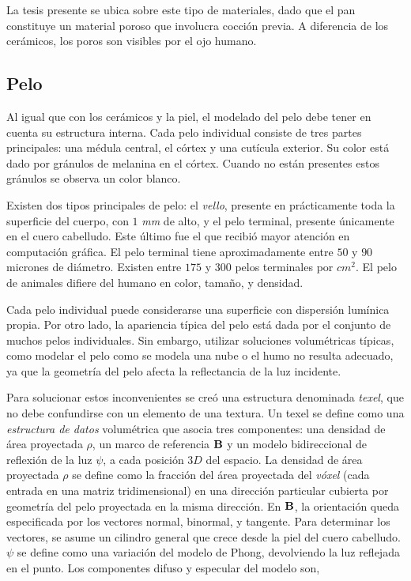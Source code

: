 La tesis presente se ubica sobre este tipo de materiales, dado que el pan constituye un material poroso que involucra cocción previa.
A diferencia de los cerámicos, los poros son visibles por el ojo humano.

\subsection{Pelo}
Al igual que con los cerámicos y la piel, el modelado del pelo debe tener en cuenta su estructura interna.
Cada pelo individual consiste de tres partes principales: una médula central, el córtex y una cutícula exterior.
Su color está dado por gránulos de melanina en el córtex.
Cuando no están presentes estos gránulos se observa un color blanco.


Existen dos tipos principales de pelo: el {\em vello}, presente en prácticamente toda la superficie del cuerpo, con $1$ {\em mm} de alto, y el {pelo terminal}, presente únicamente en el cuero cabelludo.
Este último fue el que recibió mayor atención en computación gráfica.
El pelo terminal tiene aproximadamente entre $50$ y $90$ micrones de diámetro.
Existen entre $175$ y $300$ pelos terminales por {\em $cm^{2}$}.
El pelo de animales difiere del humano en color, tamaño, y densidad.

Cada pelo individual puede considerarse una superficie con dispersión lumínica propia.
Por otro lado, la apariencia típica del pelo está dada por el conjunto de muchos pelos individuales.
Sin embargo, utilizar soluciones volumétricas típicas, como modelar el pelo como se modela una nube o el humo no resulta adecuado, ya que la geometría del pelo afecta la reflectancia de la luz incidente.

Para solucionar estos inconvenientes se creó una estructura denominada {\em texel}, que no debe confundirse con un elemento de una textura.
Un texel se define como una {\em estructura de datos} volumétrica que asocia tres componentes: una densidad de área proyectada $\rho$, un marco de referencia $\bold{B}$ y un modelo bidireccional de reflexión de la luz $\psi$, a cada posición $3D$ del espacio.
La densidad de área proyectada $\rho$ se define como la fracción del área proyectada del {\em vóxel} (cada entrada en una matriz tridimensional) en una dirección particular cubierta por geometría del pelo proyectada en la misma dirección.
En $\bold{B}$, la orientación queda especificada por los vectores normal, binormal, y tangente.
Para determinar los vectores, se asume un cilindro general que crece desde la piel del cuero cabelludo.
$\psi$ se define como una variación del modelo de Phong, devolviendo la luz reflejada en el punto.
Los componentes difuso y especular del modelo son,

